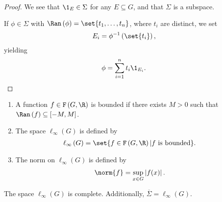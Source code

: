 \begin{proof}
  We see that $\1_{E}\in \Sigma$ for any $E\subseteq G$, and that $\Sigma$ is a subspace.\newline

  If $\phi\in \Sigma$ with $\Ran\left(\phi\right) = \set{t_1,\dots,t_n}$, where $t_i$ are distinct, we set
  \begin{align*}
    E_i &= \phi^{-1}\left(\set{t_i}\right),
  \end{align*}
  yielding
  \begin{align*}
    \phi &= \sum_{i=1}^{n}t_i\1_{E_i}.
  \end{align*}
\end{proof}
\begin{definition}\hfill
  \begin{enumerate}[(1)]
    \item A function $f\in \mathcal{F}\left(G,\R\right)$ is bounded if there exists $M > 0$ such that $\Ran\left(f\right) \subseteq \left[-M,M\right]$.
    \item The space $\ell_{\infty}\left(G\right)$ is defined by
      \begin{align*}
        \ell_{\infty}\left(G\right) &= \set{f\in \mathcal{F}\left(G,\R\right)| f\text{ is bounded}}.
      \end{align*}
    \item The norm on $\ell_{\infty}\left(G\right)$ is defined by
      \begin{align*}
        \norm{f} &= \sup_{x\in G}\left\vert f(x) \right\vert.
      \end{align*}
  \end{enumerate}
\end{definition}
\begin{proposition}
  The space $\ell_{\infty}(G)$ is complete. Additionally, $\overline{\Sigma} = \ell_{\infty}\left(G\right)$.
\end{proposition}
